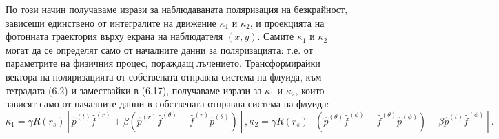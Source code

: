 По този начин получаваме изрази за наблюдаваната поляризация на безкрайност, зависещи единствено от интегралите на движение $\kappa_1$ и $\kappa_2$, и проекцията на фотонната траектория върху екрана на наблюдателя $(x,y)$. Самите $\kappa_1$ и $\kappa_2$ могат да се определят само от началните данни за поляризацията: т.е. от параметрите на физичния процес, пораждащ лъчението. Трансформирайки вектора на поляризацията от собствената отправна система на флуида, към тетрадата (6.2) и замествайки в (6.17), получаваме изрази за $\kappa_1$ и $\kappa_2$, които зависят само от началните данни в собствената отправна система на флуида:
\begin{subequations}
	\begin{equation}
		\kappa_1 = \gamma R(r_s)\left[\hat{p}^{(t)}\hat{f}^{(r)} + \beta\left(\hat{p}^{(r)}\hat{f}^{(\theta)} - \hat{f}^{(r)}\hat{p}^{(\theta)}\right)\right],
	\end{equation}
	\begin{equation}
		\kappa_2 = \gamma R(r_s)\left[\left(\hat{p}^{(\theta)}\hat{f}^{(\phi)} - \hat{f}^{(\theta)}\hat{p}^{(\phi)}\right) - \beta \hat{p}^{(t)} \hat{f}^{(\phi)}\right].
	\end{equation}
\end{subequations}

